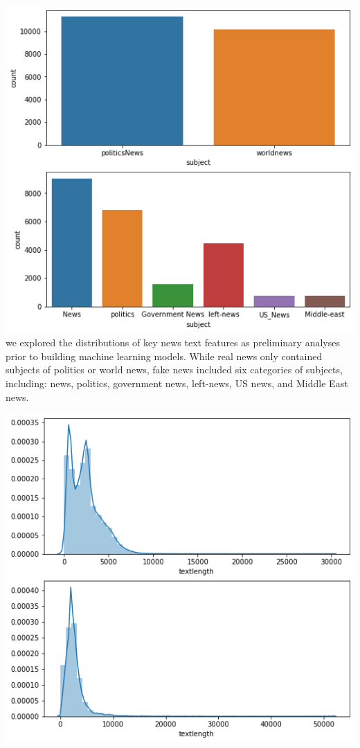 \documentclass{article}
\begin{document}
\begin{multicols}{2}
\includegraphics[scale=0.4]{images/img2.png}
we explored the distributions of key news text features as preliminary analyses prior to building machine learning models. While real news only contained subjects of politics or world news, fake news included six categories of subjects, including: news, politics, government news, left-news, US news, and Middle East news.

\includegraphics[scale=0.4]{images/img3.png}


\end{multicols}
\end{document}
